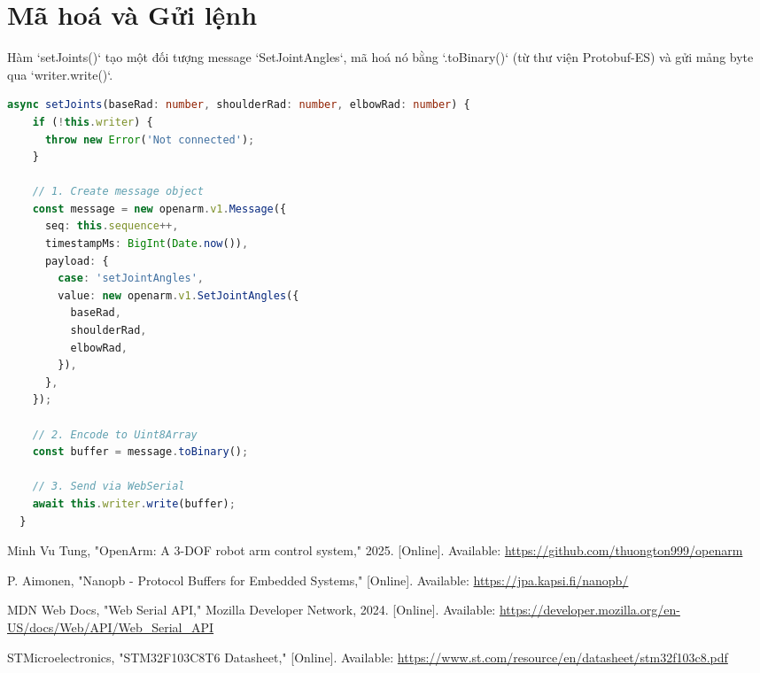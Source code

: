 \documentclass[12pt, a4paper, oneside]{report}
\numberwithin{equation}{chapter} %
\numberwithin{figure}{chapter}   %
\numberwithin{table}{chapter}    %
\begin{document}
\section{Mã hoá và Gửi lệnh}
Hàm `setJoints()` tạo một đối tượng message `SetJointAngles`, mã hoá nó bằng `.toBinary()` (từ thư viện Protobuf-ES) và gửi mảng byte qua `writer.write()`.

\begin{lstlisting}[language=TypeScript, caption={Hàm mã hoá và gửi lệnh SetJointAngles}, label={lst:web-send}, float=H]
  async setJoints(baseRad: number, shoulderRad: number, elbowRad: number) {
    if (!this.writer) {
      throw new Error('Not connected');
    }

    // 1. Create message object
    const message = new openarm.v1.Message({
      seq: this.sequence++,
      timestampMs: BigInt(Date.now()),
      payload: {
        case: 'setJointAngles',
        value: new openarm.v1.SetJointAngles({
          baseRad,
          shoulderRad,
          elbowRad,
        }),
      },
    });

    // 2. Encode to Uint8Array
    const buffer = message.toBinary();
    
    // 3. Send via WebSerial
    await this.writer.write(buffer);
  }
\end{lstlisting}

\cleardoublepage
{}
\begin{thebibliography}{9}
\label{sec:references}

Minh Vu Tung, "OpenArm: A 3-DOF robot arm control system," 2025. [Online]. Available: \url{https://github.com/thuongton999/openarm}

P. Aimonen, "Nanopb - Protocol Buffers for Embedded Systems," [Online]. Available: \url{https://jpa.kapsi.fi/nanopb/}

MDN Web Docs, "Web Serial API," Mozilla Developer Network, 2024. [Online]. Available: \url{https://developer.mozilla.org/en-US/docs/Web/API/Web_Serial_API}

STMicroelectronics, "STM32F103C8T6 Datasheet," [Online]. Available: \url{https://www.st.com/resource/en/datasheet/stm32f103c8.pdf}

\end{thebibliography}
\end{document}
